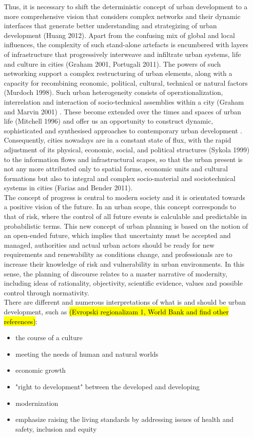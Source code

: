 \documentclass[11pt]{report}
\begin{document}
Thus, it is necessary to shift the deterministic concept of urban development to a more comprehensive vision that considers complex networks and their dynamic interfaces that generate better understanding and strategizing of urban development (Huang 2012). Apart from the confusing mix of global and local influences, the complexity of such stand-alone artefacts is encumbered with layers of infrastructure that progressively interweave and infiltrate urban systems, life and culture in cities (Graham 2001, Portugali 2011). The powers of such networking support a complex restructuring of urban elements, along with a capacity for recombining economic, political, cultural, technical or natural factors (Murdoch 1998). Such urban heterogeneity consists of operationalization, interrelation and interaction of socio-technical assemblies within a city (Graham and Marvin 2001) . These become extended over the times and spaces of urban life  (Mitchell 1996) and offer us an opportunity to construct dynamic, sophisticated and synthesised approaches to contemporary urban development . Consequently, cities nowadays are in a constant state of flux, with the rapid adjustment of its physical, economic, social, and political structures (Sykola 1999) to the information flows and infrastructural scapes, so that the urban present is not any more attributed only to spatial forms, economic units and cultural formations but also to integral and complex socio-material and sociotechnical systems in cities (Farias and Bender 2011). 
\\
The concept of progress is central to modern society and it is orientated towards a positive vision of the future. In an urban scope, this concept corresponds to that of risk, where the control of all future events is calculable and predictable in probabilistic terms. This new concept of urban planning is based on the notion of an open-ended future, which implies that uncertainty must be accepted and managed, authorities and actual urban actors should be ready for new requirements and renewability as conditions change, and professionals are to increase their knowledge of risk and vulnerability in urban environments. In this sense, the planning of discourse relates to a master narrative of modernity, including ideas of rationality, objectivity, scientific evidence, values and possible control through normativity.
\\
There are different and numerous interpretations of what is and should be urban development, such as \hl{(Evropski regionalizam 1, World Bank and find other references)}:
\begin{itemize}
\item the course of a culture
\item meeting the needs of human and natural worlds
\item economic growth
\item "right to development" between the developed and developing
\item modernization
\item emphasize raising the living standards by addressing issues of health and safety, inclusion and equity
\end{itemize}  
\end{document}
